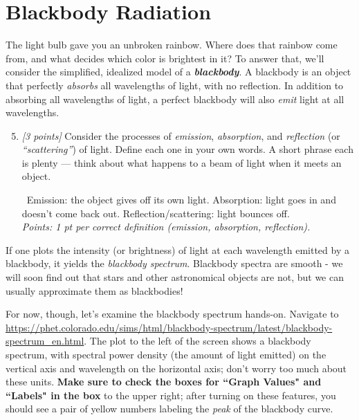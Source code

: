 \documentclass[11pt]{article}
\newcommand{\ans}[1]{%
  \par\smallskip\noindent{\color{blue!55!black}\textbf{Answer:}}\ #1\par\smallskip}
\begin{document}
\section{Blackbody Radiation}

The light bulb gave you an unbroken rainbow. Where does that rainbow come from, and what decides which color is brightest in it? To answer that, we'll consider the simplified, idealized model of a \textbf{\emph{blackbody}}. A blackbody is an object that perfectly \emph{absorbs} all wavelengths of light, with no reflection. In addition to absorbing all wavelengths of light, a perfect blackbody will also \emph{emit} light at all wavelengths.

\begin{enumerate}
    \setcounter{enumi}{4}
    \item \textit{[3 points]} Consider the processes of \emph{emission}, \emph{absorption}, and \emph{reflection} (or \emph{``scattering''}) of light.
    Define each one in your own words. A short phrase each is plenty
    --- think about what happens to a beam of light when it meets an object.

    \ans{Emission: the object gives off its own light.
    Absorption: light goes in and doesn't come back out. Reflection/scattering:
    light bounces off.
    \\[2pt]
    \emph{Points: 1 pt per correct definition (emission, absorption,
    reflection).}}
\end{enumerate}

If one plots the intensity (or brightness) of light at each wavelength emitted by a blackbody, it yields the \emph{blackbody spectrum}. Blackbody spectra are smooth - we will soon find out that stars and other astronomical objects are not, but we can usually approximate them as blackbodies! 

For now, though, let's examine the blackbody spectrum hands-on. Navigate to \url{https://phet.colorado.edu/sims/html/blackbody-spectrum/latest/blackbody-spectrum_en.html}. The plot to the left of the screen shows a blackbody spectrum, with spectral power density (the amount of light emitted) on the vertical axis and wavelength on the horizontal axis; don't worry too much about these units. \textbf{Make sure to check the boxes for ``Graph Values" and ``Labels" in the box }to the upper right; after turning on these features, you should see a pair of yellow numbers labeling the \emph{peak} of the blackbody curve.
\end{document}
